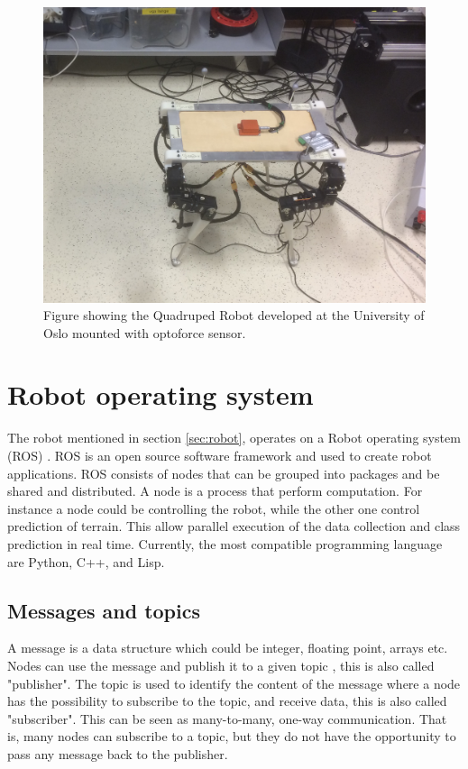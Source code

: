 \documentclass[USenglish]{ifimaster}  %
\begin{document}
\begin{figure}[h]
	\centering
	\includegraphics[width=\textwidth,height=\textheight,keepaspectratio]{Figures/Robot3}
	\caption{Figure showing the Quadruped Robot developed at the University of Oslo mounted with optoforce sensor.}
	\label{fig:robot}
\end{figure}
\FloatBarrier


\section{Robot operating system}
The robot mentioned in section \ref{sec:robot}, operates on a Robot operating system (ROS) \cite{ROSintro}. ROS is an open source software framework and used to create robot applications. ROS consists of nodes that can be grouped into packages and be shared and distributed. A node is a process that perform computation. For instance a node could be controlling the robot, while the other one control prediction of terrain. This allow parallel execution of the data collection and class prediction in real time. Currently, the most compatible programming language are Python, C++, and Lisp.

\subsection{Messages and topics}
A message is a data structure which could be integer, floating point, arrays etc. Nodes can use the message and publish it to a given topic \cite{ROSconcept}, this is also called "publisher". The topic is used to identify the content of the message where a node has the possibility to subscribe to the topic, and receive data, this is also called "subscriber". This can be seen as many-to-many, one-way communication. That is, many nodes can subscribe to a topic, but they do not have the opportunity to pass any message back to the publisher.
\end{document}

